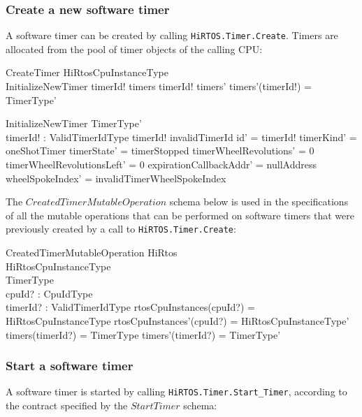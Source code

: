 \documentclass[11pt,letterpaper,twoside,openany]{book}
\begin{document}
\subsubsection{Create a new software timer}

A software timer can be created by calling \verb`HiRTOS.Timer.Create`. Timers are allocated
from the pool of timer objects of the calling CPU:

\begin{schema}{CreateTimer}
   \Delta HiRtosCpuInstanceType \\
   InitializeNewTimer
\where
   timerId! \notin \dom timers
\also
   timerId! \in \dom timers'
\also
   timers'(timerId!) = \theta TimerType'
\end{schema}

\begin{schema}{InitializeNewTimer}
   TimerType' \\
   timerId! : ValidTimerIdType
\where
   timerId! \neq invalidTimerId
\also
   id' = timerId!
\also
   timerKind' = oneShotTimer
\also
   timerState' = timerStopped
\also
   timerWheelRevolutions' = 0
\also
   timerWheelRevolutionsLeft' = 0
\also
   expirationCallbackAddr' = nullAddress
\also
   wheelSpokeIndex' = invalidTimerWheelSpokeIndex
\end{schema}

The $CreatedTimerMutableOperation$ schema below is used in the specifications of all the mutable
operations that can be performed on software timers that were previously created by a call to
\verb'HiRTOS.Timer.Create':

\begin{schema}{CreatedTimerMutableOperation}
   \Delta HiRtos \\
   \Delta HiRtosCpuInstanceType \\
   \Delta TimerType \\
   cpuId? : CpuIdType \\
   timerId? : ValidTimerIdType
\where
   rtosCpuInstances(cpuId?) = \theta HiRtosCpuInstanceType
\also
   rtosCpuInstances'(cpuId?) = \theta HiRtosCpuInstanceType'
\also
   timers(timerId?) = \theta TimerType
\also
   timers'(timerId?) = \theta TimerType'
\end{schema}

\subsubsection{Start a software timer}

A software timer is started by calling \verb`HiRTOS.Timer.Start_Timer`, according to the contract
specified by the $StartTimer$ schema:
\end{document}
